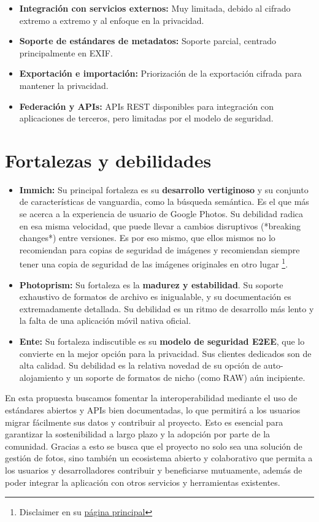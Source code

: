 \begin{itemize}
    \item \textbf{Integración con servicios externos:} Muy limitada, debido al cifrado extremo a extremo y al enfoque en la privacidad.
    \item \textbf{Soporte de estándares de metadatos:} Soporte parcial, centrado principalmente en EXIF.
    \item \textbf{Exportación e importación:} Priorización de la exportación cifrada para mantener la privacidad.
    \item \textbf{Federación y APIs:} APIs REST disponibles para integración con aplicaciones de terceros, pero limitadas por el modelo de seguridad.
\end{itemize}

\section{Fortalezas y debilidades}
\begin{itemize}
    \item \textbf{Immich:} Su principal fortaleza es su \textbf{desarrollo vertiginoso} y su conjunto de características de vanguardia, como la búsqueda semántica. Es el que más se acerca a la experiencia de usuario de Google Photos. Su debilidad radica en esa misma velocidad, que puede llevar a cambios disruptivos (*breaking changes*) entre versiones. Es por eso mismo, que ellos mismos no lo recomiendan para copias de seguridad de imágenes y recomiendan siempre tener una copia de seguridad de las imágenes originales en otro lugar \footnote{Disclaimer en su \href{https://immich.app/}{página principal}}.
    \item \textbf{Photoprism:} Su fortaleza es la \textbf{madurez y estabilidad}. Su soporte exhaustivo de formatos de archivo es inigualable, y su documentación es extremadamente detallada. Su debilidad es un ritmo de desarrollo más lento y la falta de una aplicación móvil nativa oficial.
    \item \textbf{Ente:} Su fortaleza indiscutible es su \textbf{modelo de seguridad E2EE}, que lo convierte en la mejor opción para la privacidad. Sus clientes dedicados son de alta calidad. Su debilidad es la relativa novedad de su opción de auto-alojamiento y un soporte de formatos de nicho (como RAW) aún incipiente.
\end{itemize}


En esta propuesta buscamos fomentar la interoperabilidad mediante el uso de estándares abiertos y APIs bien documentadas, lo que permitirá a los usuarios migrar fácilmente sus datos y contribuir al proyecto. Esto es esencial para garantizar la sostenibilidad a largo plazo y la adopción por parte de la comunidad.
Gracias a esto se busca que el proyecto no solo sea una solución de gestión de fotos, sino también un ecosistema abierto y colaborativo que permita a los usuarios y desarrolladores contribuir y beneficiarse mutuamente, además de poder integrar la aplicación con otros servicios y herramientas existentes.

